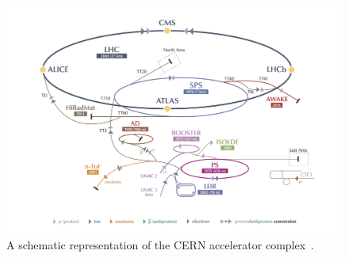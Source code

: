 \begin{figure}[h]
\centering
\includegraphics[width=1.0\columnwidth]{figures_chapter2/cern_complex.jpg}
\caption{A schematic representation of the CERN accelerator complex~\cite{Haffner:1621894}.}
\label{fig:cern}
\end{figure}

